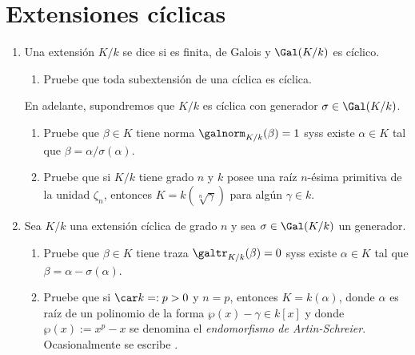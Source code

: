 \documentclass[11pt, reqno]{amsart}
\begin{document}
\newex
\section{Extensiones cíclicas}
\begin{enumerate}[resume]
	\item Una extensión $K/k$ se dice  si es finita, de Galois y $\Gal(K/k)$ es cíclico.
		\begin{enumerate}
			\item Pruebe que toda subextensión de una cíclica es cíclica.
		\end{enumerate}
		En adelante, supondremos que $K/k$ es cíclica con generador $\sigma \in \Gal(K/k)$.
		\begin{enumerate}[resume]
			\item\label{ex:mult_hilb90}
				Pruebe que $\beta \in K$ tiene norma $\galnorm_{K/k}(\beta) = 1$ syss existe $\alpha \in K$ tal que $\beta =
				\alpha/\sigma(\alpha)$.

			\item Pruebe que si $K/k$ tiene grado $n$ y $k$ posee una raíz $n$-ésima primitiva de la unidad $\zeta_n$, entonces
				$K = k(\sqrt[n]{\gamma})$ para algún $\gamma \in k$.
		\end{enumerate}

		\newex
	\item Sea $K/k$ una extensión cíclica de grado $n$ y sea $\sigma \in \Gal(K/k)$ un generador.
		\begin{enumerate}
			\item\label{ex:add_hilb90}
				Pruebe que $\beta \in K$ tiene traza $\galtr_{K/k}(\beta) = 0$ syss existe $\alpha \in K$ tal que $\beta =
				\alpha - \sigma(\alpha)$.

			\item Pruebe que si $\car k =: p > 0$ y $n = p$, entonces $K = k(\alpha)$, donde $\alpha$ es raíz de un polinomio de
				la forma $\wp(x) - \gamma \in k[x]$ y donde $\wp(x) := x^p - x$ se denomina el \emph{endomorfismo de Artin-Schreier}.
				Ocasionalmente se escribe .
		\end{enumerate}
		\nocite{lang:algebra}
\end{enumerate}
\end{document}
